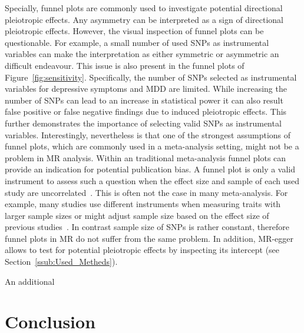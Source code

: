Specially, funnel plots are commonly used to investigate potential directional pleiotropic effects.
Any asymmetry can be interpreted as a sign of directional pleiotropic effects.
However, the visual inspection of funnel plots can be questionable.
For example, a small number of used SNPs as instrumental variables can make the interpretation as either symmetric or asymmetric an difficult endeavour. 
This issue is also present in the funnel plots of Figure~\ref{fig:sensitivity}.
Specifically, the number of SNPs selected as instrumental variables for depressive symptoms and MDD are limited. 
While increasing the number of SNPs can lead to an increase in statistical power it can also result false positive or false negative findings due to induced pleiotropic effects.
This further demonstrates the importance of selecting valid SNPs as instrumental variables.
Interestingly, nevertheless is that one of the strongest assumptions of funnel plots, which are commonly used in a meta-analysis setting, might not be a problem in MR analysis.
Within an traditional meta-analysis funnel plots can provide an indication for potential publication bias.
A funnel plot is only a valid instrument to assess such a question when the effect size and sample of each used study are uncorrelated~\cite{Evans2013}.
This is often not the case in many meta-analysis.
For example, many studies use different instruments when measuring traits with larger sample sizes or might adjust sample size based on the effect size of previous studies~\cite{Simonsohn}.
In contrast sample size of SNPs is rather constant, therefore funnel plots in MR do not suffer from the same problem.
In addition, MR-egger allows to test for potential pleiotropic effects by inspecting its intercept (see Section~\ref{ssub:Used_Metheds}).

An additional 

\section{Conclusion}
\label{sec:conclusion}

